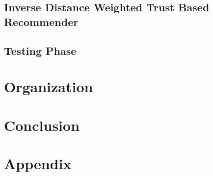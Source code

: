 \documentclass[12pt]{article}
\begin{document}
	\subsection{Inverse Distance Weighted Trust Based Recommender}
	
	
	\subsection{Testing Phase}
	
	
	\section{Organization}
	
	
	\section{Conclusion}
	

	\section{Appendix}
	
	
	
	
	
	
\end{document}
